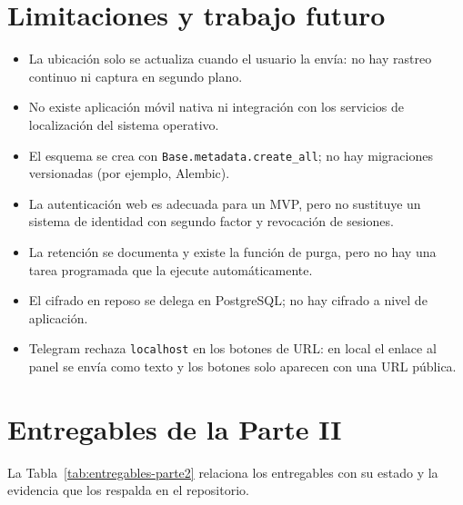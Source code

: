 \section{Limitaciones y trabajo futuro}

\begin{itemize}[leftmargin=*, topsep=2pt, itemsep=2pt]
	\item La ubicación solo se actualiza cuando el usuario la envía: no hay rastreo continuo ni captura en segundo plano.
	\item No existe aplicación móvil nativa ni integración con los servicios de localización del sistema operativo.
	\item El esquema se crea con \texttt{Base.metadata.create\_all}; no hay migraciones versionadas (por ejemplo, Alembic).
	\item La autenticación web es adecuada para un MVP, pero no sustituye un sistema de identidad con segundo factor y revocación de sesiones.
	\item La retención se documenta y existe la función de purga, pero no hay una tarea programada que la ejecute automáticamente.
	\item El cifrado en reposo se delega en PostgreSQL; no hay cifrado a nivel de aplicación.
	\item Telegram rechaza \texttt{localhost} en los botones de URL: en local el enlace al panel se envía como texto y los botones solo aparecen con una URL pública.
\end{itemize}

\section{Entregables de la Parte II}

La Tabla~\ref{tab:entregables-parte2} relaciona los entregables con su estado y la evidencia que los respalda en el repositorio.

